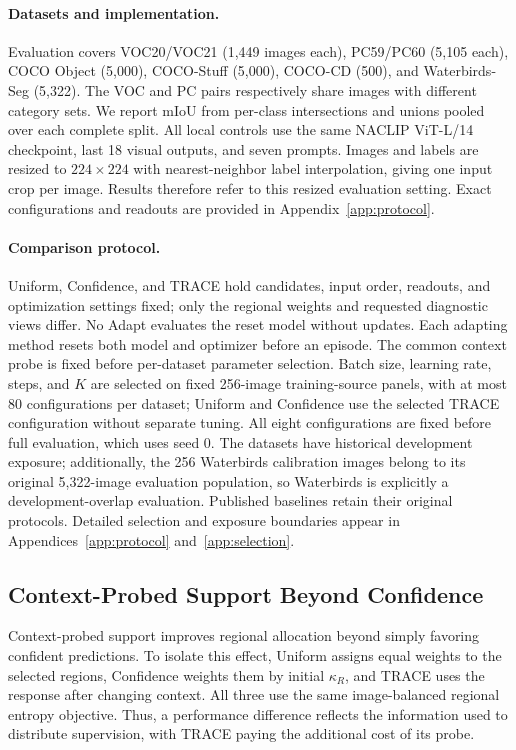 \documentclass[letterpaper]{article}
\begin{document}
\paragraph{Datasets and implementation.}
Evaluation covers VOC20/VOC21 (1,449 images each), PC59/PC60 (5,105 each), COCO Object (5,000), COCO-Stuff (5,000), COCO-CD (500), and Waterbirds-Seg (5,322). The VOC and PC pairs respectively share images with different category sets. We report mIoU from per-class intersections and unions pooled over each complete split. All local controls use the same NACLIP ViT-L/14 checkpoint, last 18 visual outputs, and seven prompts. Images and labels are resized to $224\times224$ with nearest-neighbor label interpolation, giving one input crop per image. Results therefore refer to this resized evaluation setting. Exact configurations and readouts are provided in Appendix~\ref{app:protocol}.

\paragraph{Comparison protocol.}
Uniform, Confidence, and TRACE hold candidates, input order, readouts, and optimization settings fixed; only the regional weights and requested diagnostic views differ. No Adapt evaluates the reset model without updates. Each adapting method resets both model and optimizer before an episode. The common context probe is fixed before per-dataset parameter selection. Batch size, learning rate, steps, and $K$ are selected on fixed 256-image training-source panels, with at most 80 configurations per dataset; Uniform and Confidence use the selected TRACE configuration without separate tuning. All eight configurations are fixed before full evaluation, which uses seed 0. The datasets have historical development exposure; additionally, the 256 Waterbirds calibration images belong to its original 5,322-image evaluation population, so Waterbirds is explicitly a development-overlap evaluation. Published baselines retain their original protocols. Detailed selection and exposure boundaries appear in Appendices~\ref{app:protocol} and~\ref{app:selection}.

\subsection{Context-Probed Support Beyond Confidence}
\label{sec:allocation}
Context-probed support improves regional allocation beyond simply favoring confident predictions. To isolate this effect, Uniform assigns equal weights to the selected regions, Confidence weights them by initial $\kappa_R$, and TRACE uses the response after changing context. All three use the same image-balanced regional entropy objective. Thus, a performance difference reflects the information used to distribute supervision, with TRACE paying the additional cost of its probe.
\end{document}
